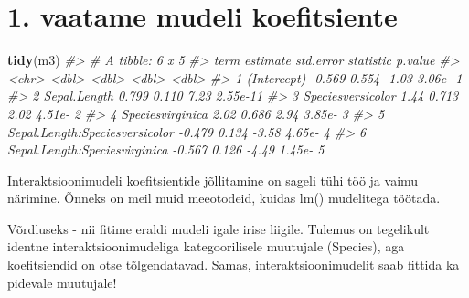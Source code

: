 \documentclass[]{book}
\newenvironment{Shaded}{\begin{snugshade}}{\end{snugshade}}
\newcommand{\KeywordTok}[1]{\textcolor[rgb]{0.13,0.29,0.53}{\textbf{#1}}}
\newcommand{\CommentTok}[1]{\textcolor[rgb]{0.56,0.35,0.01}{\textit{#1}}}
\newcommand{\NormalTok}[1]{#1}
\begin{document}
\section*{1. vaatame mudeli
koefitsiente}\label{vaatame-mudeli-koefitsiente}

\begin{Shaded}
\begin{Highlighting}[]
\KeywordTok{tidy}\NormalTok{(m3)}
\CommentTok{#> # A tibble: 6 x 5}
\CommentTok{#>   term                           estimate std.error statistic  p.value}
\CommentTok{#>   <chr>                             <dbl>     <dbl>     <dbl>    <dbl>}
\CommentTok{#> 1 (Intercept)                      -0.569     0.554     -1.03 3.06e- 1}
\CommentTok{#> 2 Sepal.Length                      0.799     0.110      7.23 2.55e-11}
\CommentTok{#> 3 Speciesversicolor                 1.44      0.713      2.02 4.51e- 2}
\CommentTok{#> 4 Speciesvirginica                  2.02      0.686      2.94 3.85e- 3}
\CommentTok{#> 5 Sepal.Length:Speciesversicolor   -0.479     0.134     -3.58 4.65e- 4}
\CommentTok{#> 6 Sepal.Length:Speciesvirginica    -0.567     0.126     -4.49 1.45e- 5}
\end{Highlighting}
\end{Shaded}

Interaktsioonimudeli koefitsientide jõllitamine on sageli tühi töö ja
vaimu närimine. Õnneks on meil muid meeotodeid, kuidas lm() mudelitega
töötada.

Võrdluseks - nii fitime eraldi mudeli igale irise liigile. Tulemus on
tegelikult identne interaktsioonimudeliga kategoorilisele muutujale
(Species), aga koefitsiendid on otse tõlgendatavad. Samas,
interaktsioonimudelit saab fittida ka pidevale muutujale!
\end{document}
